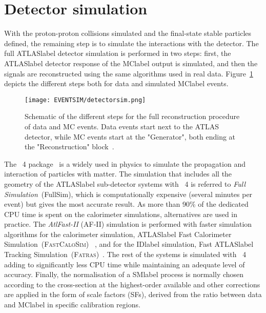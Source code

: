 \section{Detector simulation}

With the proton-proton collisions simulated and the final-state stable particles defined, the remaining step is to simulate the interactions with the detector. The full \acrshort{ATLASlabel} detector simulation is performed in two steps: first, the \acrshort{ATLASlabel} detector response of the \acrshort{MClabel} output is simulated, and then the signals are reconstructed using the same algorithms used in real data. Figure~\ref{figEVNTSIM:detectorsim} depicts the different steps both for data and simulated \acrshort{MClabel} events.

\begin{figure}[htbp]
    \RawFloats
    \begin{center}
    \texttt{[image: EVENTSIM/detectorsim.png]}
    \caption{
        Schematic of the different steps for the full reconstruction procedure of data and MC events. Data events start next to the ATLAS detector, while MC events start at the "Generator", both ending at the "Reconstruction" block~\cite{Aad_2010}.}
    \label{figEVNTSIM:detectorsim}
    \end{center}
\end{figure}

The \GEANT~4 package~\cite{AGOSTINELLI2003250} is a widely used in physics to simulate the propagation and interaction of particles with matter. The simulation that includes all the geometry of the \acrshort{ATLASlabel} sub-detector systems with \GEANT~4 is referred to \textit{Full Simulation}~(FullSim), which is computationally expensive (several minutes per event) but gives the most accurate result. As more than 90\% of the dedicated CPU time is spent on the calorimeter simulations, alternatives are used in practice. The \textit{AtlFast-II} (AF-II) simulation is performed with faster simulation algorithms for the calorimeter simulation, \acrshort{ATLASlabel} Fast Calorimeter Simulation~(\textsc{FastCaloSim})~\cite{ATLAS:1300517}
, and for the \acrshort{IDlabel} simulation, Fast \acrshort{ATLASlabel} Tracking Simulation~(\textsc{Fatras})~\cite{Edmonds:1091969}. The rest of the systems is simulated with \GEANT~4 adding to significantly less CPU time while maintaining an adequate level of accuracy. Finally, the normalisation of a \acrshort{SMlabel} process is normally chosen according to the cross-section at the highest-order available and other corrections are applied in the form of scale factors (SFs), derived from the ratio between data and \acrshort{MClabel} in specific calibration regions.